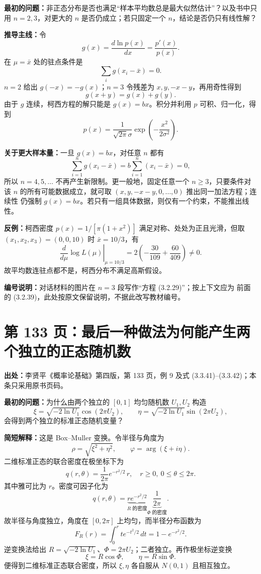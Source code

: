 \documentclass[UTF8,a4paper,11pt]{ctexart}
\begin{document}
\textbf{最初的问题：}非正态分布是否也满足“样本平均数总是最大似然估计”？以及书中只用
$n=2,3$，对更大的 $n$ 是否仍成立；若只固定一个 $n$，结论是否仍只有线性解？

\textbf{推导主线：}令
\[
g(x)=\frac{d\ln p(x)}{dx}=\frac{p'(x)}{p(x)}.
\]
在 $\mu=\bar x$ 处的驻点条件是
\[
\sum_i g(x_i-\bar x)=0.
\]
$n=2$ 给出 $g(-x)=-g(x)$；$n=3$ 令残差为 $x,y,-x-y$，再用奇性得到
\[
g(x+y)=g(x)+g(y).
\]
由于 $g$ 连续，柯西方程的解只能是 $g(x)=bx$。积分并利用 $p$ 可积、归一化，得到
\[
p(x)=\frac{1}{\sqrt{2\pi}\sigma}
\exp\!\left(-\frac{x^2}{2\sigma^2}\right).
\]

\textbf{关于更大样本量：}一旦 $g(x)=bx$，对任意 $n$ 都有
\[
\sum_{i=1}^n g(x_i-\bar x)=b\sum_{i=1}^n(x_i-\bar x)=0,
\]
所以 $n=4,5,\ldots$ 不再产生新限制。更一般地，固定任意一个 $n\ge3$，只要条件对该
$n$ 的所有可能数据成立，就可取 $(x,y,-x-y,0,\ldots,0)$ 推出同一加法方程；连续性
仍强制 $g(x)=bx$。若只有一组具体数据，则仅有一个约束，不能推出线性。

\textbf{反例：}柯西密度 $p(x)=1/[\pi(1+x^2)]$ 满足对称、处处为正且光滑，但取
$(x_1,x_2,x_3)=(0,0,10)$ 时 $\bar x=10/3$，有
\[
\left.\frac{d}{d\mu}\log L(\mu)\right|_{\mu=10/3}
 =2\left(-\frac{30}{109}+\frac{60}{409}\right)\ne0.
\]
故平均数连驻点都不是，柯西分布不满足高斯假设。

\textbf{编号说明：}对话材料的图片在 $n=3$ 段写作“方程 (3.2.29)”；按上下文应为
前面的 (3.2.39)，此处按原文保留说明，不据此改写教材编号。

\newpage
\section{第 133 页：最后一种做法为何能产生两个独立的正态随机数}
\label{note:probability-p133-box-muller}
\textbf{出处：}李贤平《概率论基础》第四版，第 133 页，例 9 及式 (3.3.41)--(3.3.42)；本条只采用原书页码。

\textbf{最初的问题：}为什么由两个独立的 $[0,1]$ 均匀随机数 $U_1,U_2$ 构造
\[
\xi=\sqrt{-2\ln U_1}\cos(2\pi U_2),\qquad
\eta=\sqrt{-2\ln U_1}\sin(2\pi U_2),
\]
会得到两个独立的标准正态随机变量？

\textbf{简短解释：}这是 Box--Muller 变换。令半径与角度为
\[
\rho=\sqrt{\xi^2+\eta^2},\qquad \varphi=\arg(\xi+i\eta).
\]
二维标准正态的联合密度在极坐标下为
\[
q(r,\theta)=\frac1{2\pi}e^{-r^2/2}\,r,\quad r\ge0,\ 0\le\theta\le2\pi.
\]
其中雅可比为 $r$。密度可因子化为
\[
q(r,\theta)=\underbrace{re^{-r^2/2}}_{\text{$R$ 的密度}}
\underbrace{\frac1{2\pi}}_{\text{$\Phi$ 的密度}}.
\]
故半径与角度独立，角度在 $[0,2\pi]$ 上均匀，而半径分布函数为
\[
F_R(r)=\int_0^r te^{-t^2/2}\,dt=1-e^{-r^2/2}.
\]
逆变换法给出 $R=\sqrt{-2\ln U_1}$、$\Phi=2\pi U_2$；二者独立。再作极坐标逆变换
\[
\xi=R\cos\Phi,\qquad \eta=R\sin\Phi.
\]
便得到二维标准正态联合密度，所以 $\xi,\eta$ 各自服从 $N(0,1)$ 且相互独立。
\end{document}
